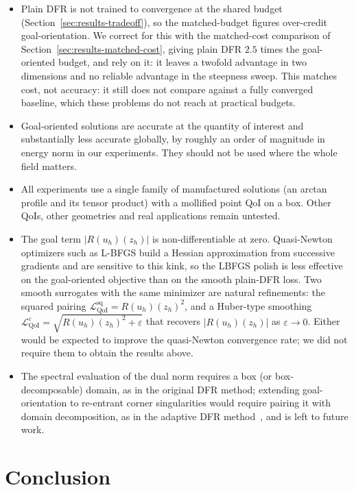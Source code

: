 \documentclass[preprint,11pt]{elsarticle}
\begin{document}
\begin{itemize}
    \item Plain DFR is not trained to convergence at the shared budget (Section~\ref{sec:results-tradeoff}), so the matched-budget figures over-credit goal-orientation. We correct for this with the matched-cost comparison of Section~\ref{sec:results-matched-cost}, giving plain DFR $2.5$ times the goal-oriented budget, and rely on it: it leaves a twofold advantage in two dimensions and no reliable advantage in the steepness sweep. This matches cost, not accuracy: it still does not compare against a fully converged baseline, which these problems do not reach at practical budgets.
    \item Goal-oriented solutions are accurate at the quantity of interest and substantially less accurate globally, by roughly an order of magnitude in energy norm in our experiments. They should not be used where the whole field matters.
    \item All experiments use a single family of manufactured solutions (an arctan profile and its tensor product) with a mollified point QoI on a box. Other QoIs, other geometries and real applications remain untested.
    \item The goal term $|R(u_h)(z_h)|$ is non-differentiable at zero. Quasi-Newton optimizers such as L-BFGS build a Hessian approximation from successive gradients and are sensitive to this kink, so the LBFGS polish is less effective on the goal-oriented objective than on the smooth plain-DFR loss. Two smooth surrogates with the same minimizer are natural refinements: the squared pairing $\mathcal{L}_{\mathrm{QoI}}^{\text{sq}} = R(u_h)(z_h)^2$, and a Huber-type smoothing $\mathcal{L}_{\mathrm{QoI}}^{\varepsilon} = \sqrt{R(u_h)(z_h)^2 + \varepsilon}$ that recovers $|R(u_h)(z_h)|$ as $\varepsilon \to 0$. Either would be expected to improve the quasi-Newton convergence rate; we did not require them to obtain the results above.
    \item The spectral evaluation of the dual norm requires a box (or box-decomposable) domain, as in the original DFR method; extending goal-orientation to re-entrant corner singularities would require pairing it with domain decomposition, as in the adaptive DFR method~\citep{taylor2024adaptivedfr}, and is left to future work.
\end{itemize}

\section{Conclusion}
\label{sec:conclusion}
\end{document}

